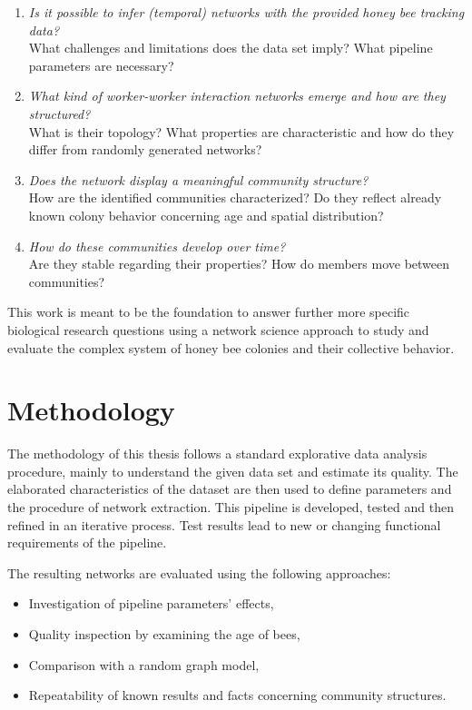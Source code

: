 \begin{enumerate}
\item \emph{Is it possible to infer (temporal) networks with the provided honey bee tracking data?}\\
What challenges and limitations does the data set imply?
What pipeline parameters are necessary?
\item \emph{What kind of worker-worker interaction networks emerge and how are they structured?}\\
What is their topology?
What properties are characteristic and how do they differ from randomly generated networks?
\item \emph{Does the network display a meaningful community structure?}\\
How are the identified communities characterized?
Do they reflect already known colony behavior concerning age and spatial distribution?
\item \emph{How do these communities develop over time?}\\
Are they stable regarding their properties?
How do members move between communities?
\end{enumerate}

This work is meant to be the foundation to answer further more specific biological research questions using a network science approach to study and evaluate the complex system of honey bee colonies and their collective behavior.

\section{Methodology}
The methodology of this thesis follows a standard explorative data analysis procedure, mainly to understand the given data set and estimate its quality. The elaborated characteristics of the dataset are then used to define parameters and the procedure of network extraction. This pipeline is developed, tested and then refined in an iterative process. Test results lead to new or changing functional requirements of the pipeline.

The resulting networks are evaluated using the following approaches:

\begin{itemize}
\item Investigation of pipeline parameters' effects,
\item Quality inspection by examining the age of bees,
\item Comparison with a random graph model,
\item Repeatability of known results and facts concerning community structures.
\end{itemize}

